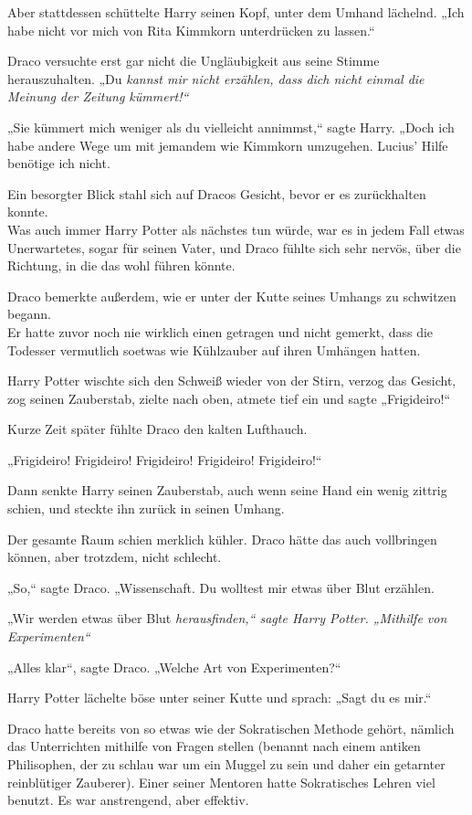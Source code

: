 {Aber stattdessen schüttelte Harry seinen Kopf, unter dem Umhand lächelnd. „Ich habe nicht vor mich von Rita Kimmkorn unterdrücken zu lassen.“

Draco versuchte erst gar nicht die Ungläubigkeit aus seine Stimme herauszuhalten. „Du \emph{kannst mir nicht erzählen, dass dich nicht einmal die Meinung der \emph{Zeitung} kümmert!“}

„Sie kümmert mich weniger als du vielleicht annimmst,“ sagte Harry. „Doch ich habe andere Wege um mit jemandem wie Kimmkorn umzugehen. Lucius' Hilfe benötige ich nicht.

Ein besorgter Blick stahl sich auf Dracos Gesicht, bevor er es zurückhalten konnte.\\ Was auch immer Harry Potter als nächstes tun würde, war es in jedem Fall etwas Unerwartetes, sogar für seinen Vater, und Draco fühlte sich sehr nervös, über die Richtung, in die das wohl führen könnte.

Draco bemerkte außerdem, wie er unter der Kutte seines Umhangs zu schwitzen begann.\\ Er hatte zuvor noch nie wirklich einen getragen und nicht gemerkt, dass die Todesser vermutlich soetwas wie Kühlzauber auf ihren Umhängen hatten.

Harry Potter wischte sich den Schweiß wieder von der Stirn, verzog das Gesicht, zog seinen Zauberstab, zielte nach oben, atmete tief ein und sagte „Frigideiro!“

Kurze Zeit später fühlte Draco den kalten Lufthauch.

„Frigideiro! Frigideiro! Frigideiro! Frigideiro! Frigideiro!“

Dann senkte Harry seinen Zauberstab, auch wenn seine Hand ein wenig zittrig schien, und steckte ihn zurück in seinen Umhang.

Der gesamte Raum schien merklich kühler. Draco hätte das auch vollbringen können, aber trotzdem, nicht schlecht.

„So,“ sagte Draco. „Wissenschaft. Du wolltest mir etwas über Blut erzählen.

„Wir werden etwas über Blut \emph{herausfinden,“ sagte Harry Potter. „Mithilfe von Experimenten“}

„Alles klar“, sagte Draco. „Welche Art von Experimenten?“

Harry Potter lächelte böse unter seiner Kutte und sprach: „Sagt du es mir.“

Draco hatte bereits von so etwas wie der Sokratischen Methode gehört, nämlich das Unterrichten mithilfe von Fragen stellen (benannt nach einem antiken Philisophen, der zu schlau war um ein Muggel zu sein und daher ein getarnter reinblütiger Zauberer). Einer seiner Mentoren hatte Sokratisches Lehren viel benutzt. Es war anstrengend, aber effektiv.

}

